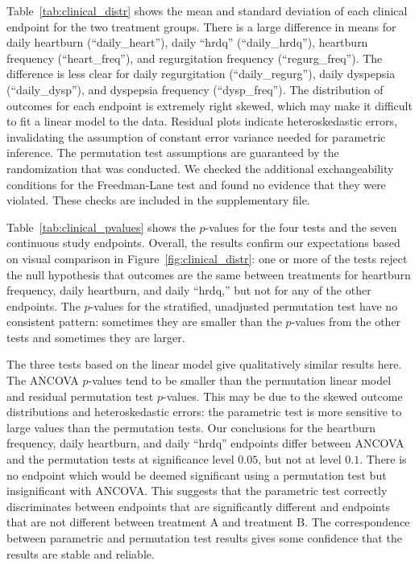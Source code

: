 \documentclass[12pt]{article}
\begin{document}
Table~\ref{tab:clinical_distr} shows the mean and standard deviation of each clinical endpoint for the two treatment groups.
There is a large difference in means for daily heartburn (``daily\_heart''), daily ``hrdq'' (``daily\_hrdq''), heartburn frequency (``heart\_freq''), and regurgitation frequency (``regurg\_freq'').
The difference is less clear for daily regurgitation (``daily\_regurg''), daily dyspepsia (``daily\_dysp''), and dyspepsia frequency (``dysp\_freq'').
The distribution of outcomes for each endpoint is extremely right skewed, which may make it difficult to fit a linear model to the data.
Residual plots indicate heteroskedastic errors, invalidating the assumption of constant error variance needed for parametric inference.
The permutation test assumptions are guaranteed by the randomization that was conducted.
We checked the additional exchangeability conditions for the Freedman-Lane test and found no evidence that they were violated. 
These checks are included in the supplementary file.

Table~\ref{tab:clinical_pvalues} shows the $p$-values for the four tests and the seven continuous study endpoints.
Overall, the results confirm our expectations based on visual comparison in Figure~\ref{fig:clinical_distr}:
one or more of the tests reject the null hypothesis that outcomes are the same between treatments for heartburn frequency, daily heartburn, and daily ``hrdq,''
but not for any of the other endpoints.
The $p$-values for the stratified, unadjusted permutation test have no consistent pattern: sometimes they are smaller than the $p$-values from the other tests and sometimes they are larger.

The three tests based on the linear model give qualitatively similar results here.
The ANCOVA $p$-values tend to be smaller than the permutation linear model and residual permutation test $p$-values.
This may be due to the skewed outcome distributions and heteroskedastic errors: the parametric test is more sensitive to large values than the permutation tests.
Our conclusions for the heartburn frequency, daily heartburn, and daily ``hrdq'' endpoints differ between ANCOVA and the permutation tests at significance level $0.05$, but not at level $0.1$.
There is no endpoint which would be deemed significant using a permutation test but insignificant with ANCOVA.
This suggests that the parametric test correctly discriminates between endpoints that are significantly different and endpoints that are not different between treatment A and treatment B.
The correspondence between parametric and permutation test results gives some confidence that the results are stable and reliable.
\end{document}
